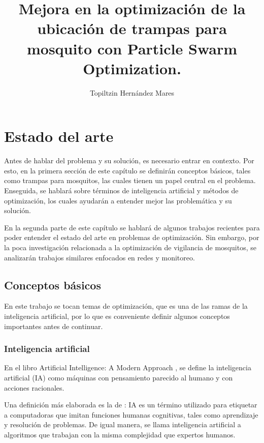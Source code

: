 \documentclass[letterpaper]{report}
\title{\bf
  Mejora en la optimización de la ubicación de trampas para mosquito con
  Particle Swarm Optimization.
}
\author{Topiltzin Hernández Mares}
\begin{document}
\maketitle
\thispagestyle{empty}
\pagestyle{empty}
\tableofcontents
\listoffigures
\listoftables



\chapter{Estado del arte}
  Antes de hablar del problema y su solución, es necesario entrar en contexto.
  Por esto, en la primera sección de este capítulo se definirán conceptos
  básicos, tales como trampas para mosquitos, las cuales tienen un papel central
  en el problema. Enseguida, se hablará sobre términos de inteligencia
  artificial y métodos de optimización, los cuales ayudarán a entender mejor las
  problemática y su solución.
  
  En la segunda parte de este capítulo se hablará de algunos trabajos recientes
  para poder entender el estado del arte en problemas de optimización. Sin
  embargo, por la poca investigación relacionada a la optimización de vigilancia
  de mosquitos, se analizarán trabajos similares enfocados en redes y
  monitoreo.

\section{Conceptos básicos}
  En este trabajo se tocan temas de optimización, que es una de las ramas de la
  inteligencia artificial, por lo que es conveniente definir algunos conceptos
  importantes antes de continuar. 

  \subsection{Inteligencia artificial}
    En el libro Artificial Intelligence: A Modern Approach
    \cite{AIModernAproach}, se define la inteligencia artificial (IA) como
    máquinas con pensamiento parecido al humano y con acciones racionales.
    
    Una definición más elaborada es la de \cite{AIDef}: IA es un término
    utilizado para etiquetar a computadoras que imitan funciones humanas
    cognitivas, tales como aprendizaje y resolución de problemas. De igual
    manera, se llama inteligencia artificial a algoritmos que trabajan con la
    misma complejidad que expertos humanos.
  
\end{document}
